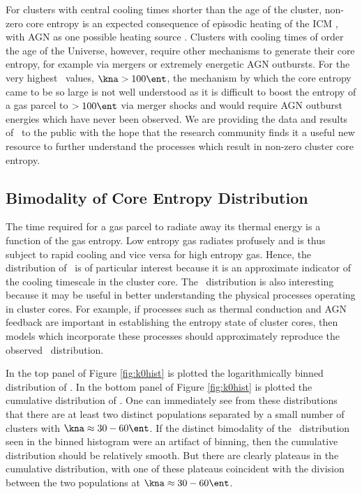 For clusters with central cooling times shorter than the age of the
cluster, non-zero core entropy is an expected consequence of episodic
heating of the ICM \citep{agnframework}, with AGN as one possible
heating source \citep{1997MNRAS.288..355B, 2000ApJ...532...17L,
2001Natur.414..425V, 2002MNRAS.332..729C, 2002Natur.418..301B,
2002MNRAS.331..545B, 2002MNRAS.333..145N, 2002ApJ...581..223R,
2002MNRAS.335..610A, 2004MNRAS.348.1105O, 2004ApJ...613..811M,
2004ApJ...615..681R, 2004ApJ...617..896H, 2004MNRAS.355..995D,
2005ApJ...622..847S, pizzolato05, 2006ApJ...643..120B,
2006ApJ...638..659M}. Clusters with cooling times of order the age of
the Universe, however, require other mechanisms to generate their core
entropy, for example via mergers or extremely energetic AGN
outbursts. For the very highest \kna\ values, $\kna > 100 \ent$, the
mechanism by which the core entropy came to be so large is not well
understood as it is difficult to boost the entropy of a gas parcel to
$> 100 \ent$ via merger shocks \citep{2008MNRAS.386.1309M} and would
require AGN outburst energies which have never been observed. We are
providing the data and results of \accept\ to the public with the hope
that the research community finds it a useful new resource to further
understand the processes which result in non-zero cluster core
entropy.

\subsection{Bimodality of Core Entropy Distribution}
\label{sec:entsuppbimod}

The time required for a gas parcel to radiate away its thermal energy
is a function of the gas entropy. Low entropy gas radiates profusely
and is thus subject to rapid cooling and vice versa for high entropy
gas. Hence, the distribution of \kna\ is of particular interest
because it is an approximate indicator of the cooling timescale in the
cluster core. The \kna\ distribution is also interesting because it
may be useful in better understanding the physical processes operating
in cluster cores. For example, if processes such as thermal conduction
and AGN feedback are important in establishing the entropy state of
cluster cores, then models which incorporate these processes should
approximately reproduce the observed \kna\ distribution.

In the top panel of Figure \ref{fig:k0hist} is plotted the
logarithmically binned distribution of \kna. In the bottom panel of
Figure \ref{fig:k0hist} is plotted the cumulative distribution of
\kna. One can immediately see from these distributions that there are
at least two distinct populations separated by a small number of
clusters with $\kna \approx 30-60 \ent$. If the distinct bimodality of
the \kna\ distribution seen in the binned histogram were an artifact
of binning, then the cumulative distribution should be relatively
smooth. But there are clearly plateaus in the cumulative distribution,
with one of these plateaus coincident with the division between the
two populations at $\kna \approx 30-60 \ent$.

